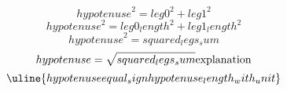 \[ {hypotenuse}^{2}={leg0}^{2}+{leg1}^{2} \]
\[ {hypotenuse}^{2}={leg0_length}^{2}+{leg1_length}^{2} \]
\[ {hypotenuse}^{2}={squared_legs_sum}\]
\[ {hypotenuse}=\sqrt{\mathstrut {squared_legs_sum}}\text{{explanation}}\]
\[ \uline{{hypotenuse}{equal_sign}{hypotenuse_length_with_unit}}\]